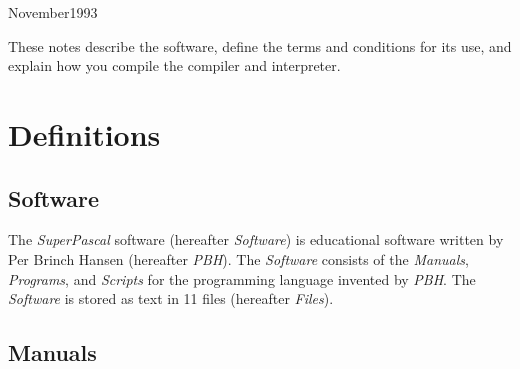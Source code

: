   {\begin{small}
     }
  {\end{small}}
\newenvironment{mytabular}[1]
  {\begin{small}
     \begin{center}
       \begin{tabular}{#1}}
  {    \end{tabular}
     \end{center}
   \end{small}}
\newenvironment{program}[1]
  {\begin{center}
     \begin{minipage}{#1}}
  {  \end{minipage}
   \end{center}}
\newcommand{\PA}
  {\noindent}
\newcommand{\PB}
  {\mbox{\hspace{1em}}}
\newcommand{\PC}
  {\mbox{\hspace{2em}}}
\newcommand{\PD}
  {\mbox{\hspace{3em}}}
\newcommand{\PE}
  {\mbox{\hspace{4em}}}



  {November}{1993}

\begin{myabstract}
  These notes describe the {\Superpascal} software, define
  the terms and conditions for its use, and explain how
  you compile the {\Superpascal} compiler and interpreter.
\end{myabstract}


\section{Definitions}

\subsection{Software}

The {\it SuperPascal} software (hereafter {\it Software}) is
educational software written by Per Brinch Hansen (hereafter
{\it PBH}). The {\it Software} consists of the {\it Manuals},
{\it Programs}, and {\it Scripts} for the programming
language {\Superpascal} invented by {\it PBH}. The {\it
Software} is stored as text in 11 files (hereafter {\it Files}).


\subsection{Manuals}

